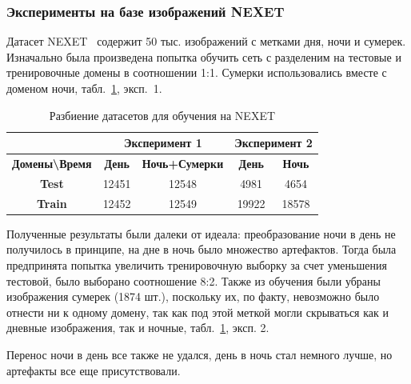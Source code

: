 \documentclass[11pt,a4paper]{extarticle}
\begin{document}
{			\subsubsection{Эксперименты на базе изображений NEXET}\label{sec:tests:nexet}
				Датасет NEXET~\cite{data:nexet} содержит 50 тыс. изображений с метками дня, ночи и сумерек.
				Изначально была произведена попытка обучить сеть с разделеним на тестовые и тренировочные домены в соотношении 1:1.
				Сумерки использовались вместе с доменом ночи, табл.~\ref{tab:tests:nexet}, эксп.~1.
				\begin{table}[ht]
					\centering
					\begin{tabular}{|c|c|c|c|c|}
					\hline
					\rowcolor[HTML]{EFEFEF} 
					\multicolumn{1}{|l|}{\cellcolor[HTML]{EFEFEF}} & \multicolumn{2}{c|}{\cellcolor[HTML]{EFEFEF}\textbf{Эксперимент 1}} & \multicolumn{2}{c|}{\cellcolor[HTML]{EFEFEF}\textbf{Эксперимент 2}} \\ \hline
					\rowcolor[HTML]{EFEFEF} 
					\textbf{Домены\textbackslash{}Время}           & \textbf{День}                & \textbf{Ночь+Сумерки}                & \textbf{День}                    & \textbf{Ночь}                    \\ \hline
					\cellcolor[HTML]{EFEFEF}\textbf{Test}          & 12451                        & 12548                                & 4981                             & 4654                             \\ \hline
					\cellcolor[HTML]{EFEFEF}\textbf{Train}         & 12452                        & 12549                                & 19922                            & 18578                            \\ \hline
					\end{tabular}
					\caption{Разбиение датасетов для обучения на NEXET}
					\label{tab:tests:nexet}
				\end{table}

				\noindent
				Полученные результаты были далеки от идеала: преобразование ночи в день не получилось в принципе, на дне в ночь было множество артефактов.
				Тогда была предпринята попытка увеличить тренировочную выборку за счет уменьшения тестовой, было выборано соотношение 8:2. 
				Также из обучения были убраны изображения сумерек (1874 шт.), поскольку их, по факту, невозможно было отнести ни к одному домену, так как под этой меткой могли скрываться как и дневные изображения, так и ночные, табл.~\ref{tab:tests:nexet}, эксп. 2.  
				
				Перенос ночи в день все также не удался, день в ночь стал немного лучше, но артефакты все еще присутствовали.

}
\end{document}
